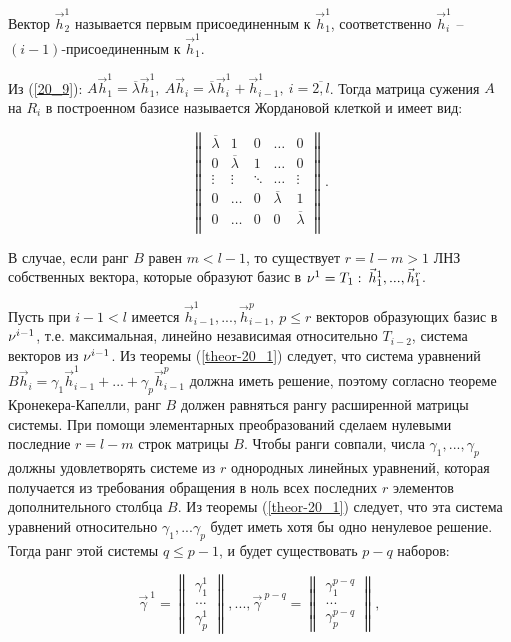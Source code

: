 Вектор $\vec{h}_2^1$ называется первым присоединенным к $\vec{h}_1^1$, соответственно $\vec{h}_i^1$ -- $(i-1)$-присоединенным к $\vec{h}_1^1$.

Из (\ref{20_9}): $A\vec{h}_1^1 = \overline{\lambda} \vec{h}_1^1, \: A\vec{h}_i = \overline{\lambda} \vec{h}_i^1 + \vec{h}_{i-1}^1, \: i = \overline{2,l}$. Тогда матрица сужения $A$ на $R_i$ в построенном базисе называется Жордановой клеткой и имеет вид:

\begin{equation*}
	\begin{Vmatrix}
		\overline{\lambda} 	& 1 	& 0 	& \ldots 	& 0 \\
		0 	& \overline{\lambda} 	& 1 	& \ldots	& 0 \\
		\vdots  & \vdots & \ddots & \ldots & \vdots \\
		0 & \ldots & 0 & \overline{\lambda} & 1 \\
		0 & \ldots & 0 & 0 & \overline{\lambda} \\
	\end{Vmatrix}.
\end{equation*}

В случае, если ранг $B$ равен $m < l - 1$, то существует $r = l - m > 1$ ЛНЗ собственных вектора, которые образуют базис в $\nu^1 = T_1 : \: \vec{h}_1^1, ... , \vec{h}_1^r$.

Пусть при $i-1 < l$ имеется $\vec{h}_{i-1}^1, ... , \vec{h}_{i-1}^p, \: p \leqslant r$ векторов образующих базис в $\nu^{i-1}$, т.е. максимальная, линейно независимая относительно $T_{i-2}$, система векторов из $\nu^{i-1}$.  Из теоремы (\ref{theor-20_1}) следует, что система уравнений $B\vec{h}_i = \gamma_1 \vec{h}_{i-1}^1 + ... + \gamma_p \vec{h}_{i-1}^p$ должна иметь решение, поэтому согласно теореме Кронекера-Капелли, ранг $B$ должен равняться рангу расширенной матрицы системы. При помощи элементарных преобразований сделаем нулевыми последние $r = l - m$ строк матрицы $B$. Чтобы ранги совпали, числа $\gamma_1, ... , \gamma_p$ должны удовлетворять системе из $r$ однородных линейных уравнений, которая получается из требования обращения в ноль всех последних $r$ элементов дополнительного столбца $B$. Из теоремы (\ref{theor-20_1}) следует, что эта система уравнений относительно $\gamma_1, ... \gamma_p$ будет иметь хотя бы одно ненулевое решение. Тогда ранг этой системы $q \leqslant p - 1$, и будет существовать $p-q$ наборов:

\begin{equation*}
	\vec{\gamma}^{\: 1} =
	\begin{Vmatrix}
		\gamma_1^1 \\
		...         \\
		\gamma_p^1
	\end{Vmatrix}
	, ... ,
	\vec{\gamma}^{\: p-q} = 
	\begin{Vmatrix}
		\gamma_1^{p-q} \\
		...         \\
		\gamma_p^{p-q}
	\end{Vmatrix}
	,
\end{equation*} 

